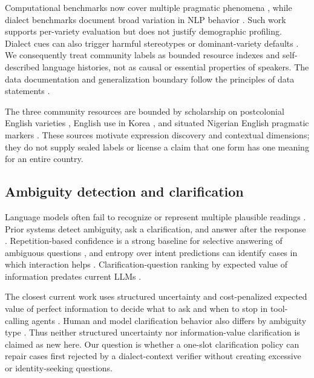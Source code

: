 \documentclass[preprint,12pt,authoryear]{elsarticle}
\begin{document}
Computational benchmarks now cover multiple pragmatic phenomena
\citep{sravanthi-etal-2024-pub}, while dialect benchmarks document broad
variation in NLP behavior \citep{ziems-etal-2023-multi,
faisal-etal-2024-dialectbench}. Such work supports per-variety evaluation but
does not justify demographic profiling. Dialect cues can also trigger harmful
stereotypes or dominant-variety defaults \citep{fleisig-etal-2024-linguistic,
hofmann2024dialect}. We consequently treat community labels as bounded
resource indexes and self-described language histories, not as causal or
essential properties of speakers. The data documentation and generalization
boundary follow the principles of data statements
\citep{bender-friedman-2018-data}.

The three community resources are bounded by scholarship on postcolonial
English varieties \citep{schneider2007postcolonial}, English use in Korea
\citep{rudiger2019korean}, and situated Nigerian English pragmatic markers
\citep{unuabonah2021abeg,honkanen2022markers}. These sources motivate
expression discovery and contextual dimensions; they do not supply sealed
labels or license a claim that one form has one meaning for an entire country.

\subsection{Ambiguity detection and clarification}

Language models often fail to recognize or represent multiple plausible
readings \citep{liu-etal-2023-afraid}. Prior systems detect ambiguity, ask a
clarification, and answer after the response
\citep{lee-etal-2023-asking}. Repetition-based confidence is a strong baseline
for selective answering of ambiguous questions
\citep{cole-etal-2023-selectively}, and entropy over intent predictions can
identify cases in which interaction helps
\citep{zhang-choi-2025-clarify}. Clarification-question ranking by expected
value of information predates current LLMs
\citep{rao-daume-iii-2018-learning,white-etal-2021-open}.

The closest current work uses structured uncertainty and cost-penalized
expected value of perfect information to decide what to ask and when to stop
in tool-calling agents \citep{suri-etal-2026-structured}. Human and model
clarification behavior also differs by ambiguity type
\citep{madge-etal-2025-referential}. Thus neither structured uncertainty nor
information-value clarification is claimed as new here. Our question is
whether a one-slot clarification policy can repair cases first rejected by a
dialect-context verifier without creating excessive or identity-seeking
questions.
\end{document}
